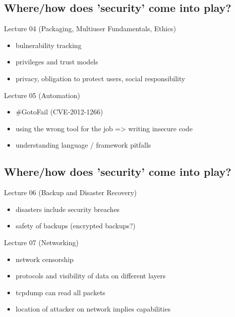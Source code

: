\documentclass[xga]{xdvislides}
\begin{document}
\subsection{Where/how does 'security' come into play?}
Lecture 04 (Packaging, Multiuser Fundamentals, Ethics)
\begin{itemize}
	\item bulnerability tracking
	\item privileges and trust models
	\item privacy, obligation to protect users, social responsibility
\end{itemize}
\vspace{.5in}
Lecture 05 (Automation)
\begin{itemize}
	\item \#GotoFail (CVE-2012-1266)
	\item using the wrong tool for the job => writing insecure code
	\item understanding language / framework pitfalls
\end{itemize}

\subsection{Where/how does 'security' come into play?}
Lecture 06 (Backup and Disaster Recovery)
\begin{itemize}
	\item disasters include security breaches
	\item safety of backups (encrypted backups?)
\end{itemize}
\vspace{.5in}
Lecture 07 (Networking)
\begin{itemize}
	\item network censorship
	\item protocols and visibility of data on different layers
	\item tcpdump can read all packets
	\item location of attacker on network implies capabilities
\end{itemize}
\end{document}
